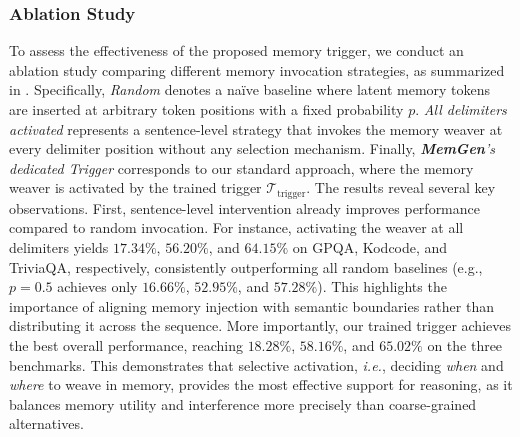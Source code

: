 \documentclass[]{fairmeta}
\newcommand{\ourmethod}{{\fontfamily{lmtt}\selectfont \textbf{MemGen}}\xspace}
\begin{document}
\subsubsection{Ablation Study}

To assess the effectiveness of the proposed memory trigger, we conduct an ablation study comparing different memory invocation strategies, as summarized in . Specifically, \textit{Random} denotes a naïve baseline where latent memory tokens are inserted at arbitrary token positions with a fixed probability $p$. \textit{All delimiters activated} represents a sentence-level strategy that invokes the memory weaver at every delimiter position without any selection mechanism. Finally, \textit{\ourmethod's dedicated Trigger} corresponds to our standard approach, where the memory weaver is activated by the trained trigger $\mathcal{T}_\text{trigger}$.
The results reveal several key observations. First, sentence-level intervention already improves performance compared to random invocation. For instance, activating the weaver at all delimiters yields $17.34\%$, $56.20\%$, and $64.15\%$ on GPQA, Kodcode, and TriviaQA, respectively, consistently outperforming all random baselines (e.g., $p=0.5$ achieves only $16.66\%$, $52.95\%$, and $57.28\%$). This highlights the importance of aligning memory injection with semantic boundaries rather than distributing it across the sequence. More importantly, our trained trigger achieves the best overall performance, reaching $18.28\%$, $58.16\%$, and $65.02\%$ on the three benchmarks. This demonstrates that selective activation, \textit{i.e.}, deciding \textit{when} and \textit{where} to weave in memory, provides the most effective support for reasoning, as it balances memory utility and interference more precisely than coarse-grained alternatives.
\end{document}
